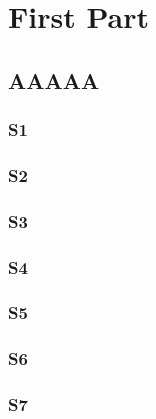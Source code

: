 \documentclass[12pt,a4paper]{report} %
\begin{document}
\mtcpagenumbers
\noptcrule
\dominitoc
\dominilof[c]                   %
\dominilot
\doparttoc                      %
\dopartlof                      %
\dopartlot                      %
\tableofcontents            %
\listoffigures              %
\fakelistoftables           %
\part{First Part}
\parttoc \partlof[r] \partlot[r]
\twocolumn\sloppy               %
\chapter{AAAAA}                 %
\minitoc[r]                     %
\lipsum[1]
\section{S1} \lipsum[2]
\section{S2} \lipsum[3]
\section{S3} \lipsum[4]
\section*{S4}
\lipsum[5]
\section{S5} \lipsum[6]
\section{S6} \lipsum[6]
\section{S7} \lipsum[7]
\end{document}
